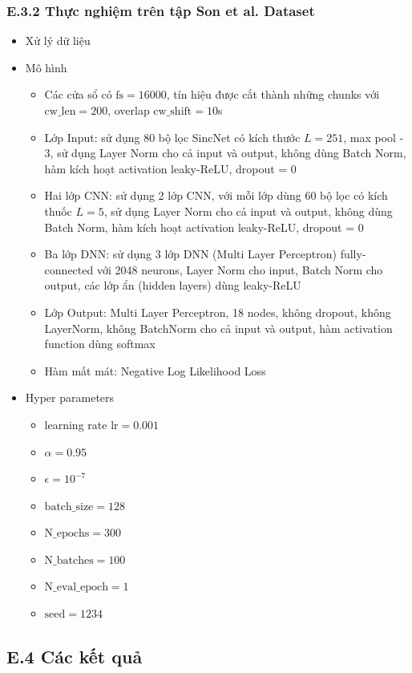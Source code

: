 \documentclass{article}
\begin{document}
	\subsubsection{E.3.2 Thực nghiệm trên tập Son et al. Dataset}
	\begin{itemize}
		\item Xử lý dữ liệu
		\item Mô hình 
			\begin{itemize}
			\item Các cửa sổ có $\text{fs} = 16000$, tín hiệu được cắt thành những chunks với $\text{cw\_len}=200$, overlap $\text{cw\_shift}=10$s
			\item Lớp Input: sử dụng 80 bộ lọc SincNet có kích thước $L=251$, max pool - 3, sử dụng Layer Norm cho cả input và output, không dùng Batch Norm, hàm kích hoạt activation leaky-ReLU, dropout = 0
			\item Hai lớp CNN: sử dụng 2 lớp CNN, với mỗi lớp dùng 60 bộ lọc có kích thuốc $L=5$, sử dụng Layer Norm cho cả input và output, không dùng Batch Norm, hàm kích hoạt activation leaky-ReLU, dropout = 0
			\item Ba lớp DNN: sử dụng 3 lớp DNN (Multi Layer Perceptron) fully-connected với 2048 neurons, Layer Norm cho input, Batch Norm cho output, các lớp ẩn (hidden layers) dùng leaky-ReLU
			\item Lớp Output: Multi Layer Perceptron, 18 nodes, không dropout, không LayerNorm, không BatchNorm cho cả input và output, hàm activation function dùng softmax
			\item Hàm mất mát: Negative Log Likelihood Loss
		\end{itemize}
		\item Hyper parameters
		\begin{itemize}
			\item learning rate $\text{lr} = 0.001$
			\item $\alpha = 0.95$
			\item $\epsilon = 10^{-7}$
			\item $\text{batch\_size}=128$
			\item $\text{N\_epochs}=300$
			\item $\text{N\_batches}=100$
			\item $\text{N\_eval\_epoch}=1$
			\item $\text{seed}=1234$
		\end{itemize}
	\end{itemize}
	\subsection{E.4 Các kết quả}
\end{document}
